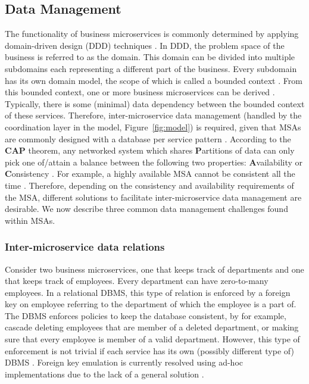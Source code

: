 \subsection{Data Management}
The functionality of business microservices is commonly determined by applying domain-driven design (DDD) techniques \cite{evans2004domain}. In DDD, the problem space of the business is referred to as the domain. This domain can be divided into multiple subdomains each representing a different part of the business. Every subdomain has its own domain model, the scope of which is called a bounded context \cite{richardson2018microservices,Dragoni2017195,Unlu2021244,Santos2019145}. From this bounded context, one or more business microservices can be derived \cite{richardson2018microservices}. Typically, there is some (minimal) data dependency between the bounded context of these services. Therefore, inter-microservice data management (handled by the coordination layer in the model, Figure~\ref{fig:model}) is required, given that MSAs are commonly designed with a database per service pattern \cite{Soldani2018215}. According to the \textbf{CAP} theorem, any networked system which shares \textbf{P}artitions of data can only pick one of/attain a balance between the following two properties: \textbf{A}vailability or \textbf{C}onsistency \cite{6133253}. For example, a highly available MSA cannot be consistent all the time \cite{richardson2018microservices}. Therefore, depending on the consistency and availability requirements of the MSA, different solutions to facilitate inter-microservice data management are desirable. We now describe three common data management challenges found within MSAs.

\subsubsection{Inter-microservice data relations}\label{sec:foreign}
Consider two business microservices, one that keeps track of departments and one that keeps track of employees. Every department can have zero-to-many employees. In a relational DBMS, this type of relation is enforced by a foreign key on employee referring to the department of which the employee is a part of. The DBMS enforces policies to keep the database consistent, by for example, cascade deleting employees that are member of a deleted department, or making sure that every employee is member of a valid department. However, this type of enforcement is not trivial if each service has its own (possibly different type of) DBMS \cite{richardson2018microservices,5-newman2021building, Laigner20213348}. Foreign key emulation is currently resolved using ad-hoc implementations due to the lack of a general solution \cite{Laigner20213348}.

